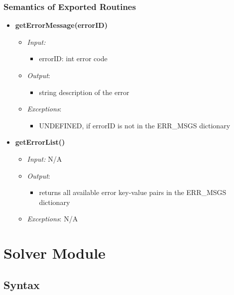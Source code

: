 \documentclass[11pt]{article}
\begin{document}
		\subsubsection{Semantics of Exported Routines}
		\begin{itemize}
		    \item \textbf{getErrorMessage(errorID)}
		\begin{itemize}
		    \item[] \textit{Input: }
			\begin{itemize}
		        \item errorID: int error code
		    \end{itemize}	    
		    
		    \item[] \textit{Output}: 
		    \begin{itemize}
		        \item string description of the error
		    \end{itemize}
		    \item[] \textit{Exceptions}:
			\begin{itemize}
		        \item UNDEFINED, if errorID is not in the ERR\_MSGS dictionary
		    \end{itemize}	  
		\end{itemize}
		
	    \item \textbf{getErrorList()}
		\begin{itemize}
		    \item[] \textit{Input: } N/A
		    
		    \item[] \textit{Output}: 
		    \begin{itemize}
		        \item returns all available error key-value pairs in the ERR\_MSGS dictionary
		    \end{itemize}
		    \item[] \textit{Exceptions}: N/A
		\end{itemize}
		
    \end{itemize}			



\section{Solver Module}
		\subsection{Syntax}
\end{document}
